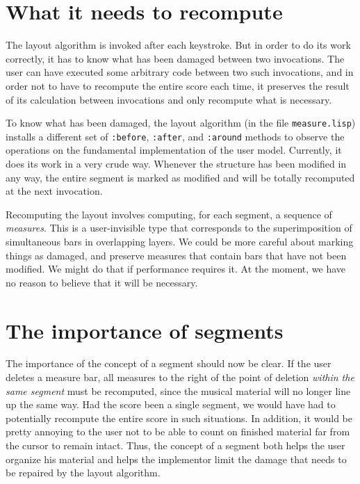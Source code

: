 \documentclass[11pt]{book}
\begin{document}
\section{What it needs to recompute}

The layout algorithm is invoked after each keystroke.  But in order to
do its work correctly, it has to know what has been damaged between
two invocations.  The user can have executed some arbitrary code
between two such invocations, and in order not to have to recompute
the entire score each time, it preserves the result of its calculation
between invocations and only recompute what is necessary. 

To know what has been damaged, the layout algorithm (in the file
\texttt{measure.lisp}) installs a different set of \texttt{:before},
\texttt{:after}, and \texttt{:around} methods to observe the
operations on the fundamental implementation of the user model.
Currently, it does its work in a very crude way.  Whenever the
structure has been modified in any way, the entire segment is marked
as modified and will be totally recomputed at the next invocation. 

Recomputing the layout involves computing, for each segment, a
sequence of \emph{measures}.  This is a user-invisible
type that corresponds to the superimposition of simultaneous bars in
overlapping layers.  We could be more careful about marking things as
damaged, and preserve measures that contain bars that have not been
modified.  We might do that if performance requires it.  At the
moment, we have no reason to believe that it will be necessary.  

\section{The importance of segments}

The importance of the concept of a segment should now be clear.
If the user deletes a measure bar, all measures to the right of the
point of deletion \emph{within the same segment} must be recomputed,
since the musical material will no longer line up the same way.  Had
the score been a single segment, we would have had to potentially
recompute the entire score in such situations.  In addition, it would
be pretty annoying to the user not to be able to count on finished
material far from the cursor to remain intact.  Thus, the concept of a
segment both helps the user organize his material and helps the
implementor limit the damage that needs to be repaired by the layout
algorithm. 
\end{document}

